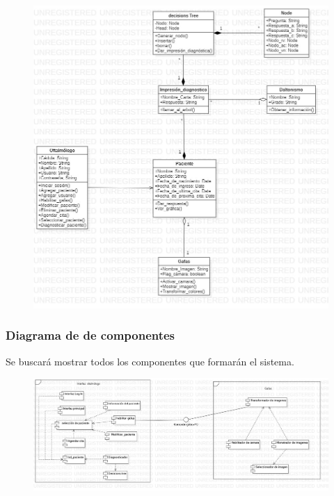 \documentclass[10pt]{article}
\begin{document}
\begin{figure}[H]
	\begin{center}
\includegraphics[scale = 0.40]{UML/ClassDiagram1.jpg}
	\end{center} 
\end{figure}


\newpage
\subsubsection{Diagrama de de componentes}

Se buscará mostrar todos los componentes que formarán el sistema.

\begin{figure}[H]
	\begin{center}
\includegraphics[scale = 0.30]{UML/ComponentDiagram1.jpg}
	\end{center} 
\end{figure}
\end{document}
